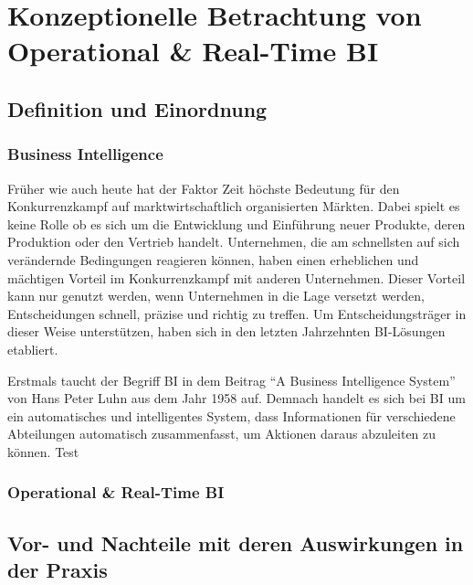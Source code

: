 \chapter{Konzeptionelle Betrachtung von Operational \& Real-Time BI}
\section{Definition und Einordnung}
\subsection{Business Intelligence}
Früher wie auch heute hat der Faktor Zeit höchste Bedeutung für den Konkurrenzkampf auf marktwirtschaftlich organisierten Märkten. Dabei spielt es keine Rolle ob es sich um die Entwicklung und Einführung neuer Produkte, deren Produktion oder den Vertrieb handelt. Unternehmen, die am schnellsten auf sich verändernde Bedingungen reagieren können, haben einen erheblichen und mächtigen Vorteil im Konkurrenzkampf mit anderen Unternehmen. \autocite[Vgl.][S. 1]{Stalk1988} Dieser Vorteil kann nur genutzt werden, wenn Unternehmen in die Lage versetzt werden, Entscheidungen schnell, präzise und richtig zu treffen. Um Entscheidungsträger in dieser Weise unterstützen, haben sich in den letzten Jahrzehnten \ac{BI}-Lösungen etabliert.

Erstmals taucht der Begriff \ac{BI} in dem Beitrag \enquote{A Business Intelligence System} von Hans Peter Luhn aus dem Jahr 1958 auf. Demnach handelt es sich bei \ac{BI} um ein automatisches und intelligentes System, dass Informationen für verschiedene Abteilungen automatisch zusammenfasst, um Aktionen daraus abzuleiten zu können. \autocite[Vgl.][S. 1]{Luhn1958ABI} Test
\subsection{Operational \& Real-Time BI}
\section{Vor- und Nachteile mit deren Auswirkungen in der Praxis}

